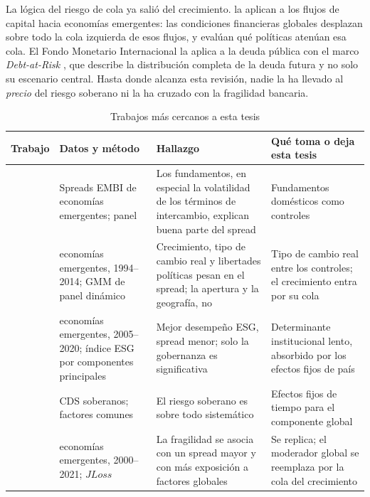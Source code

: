 La lógica del riesgo de cola ya salió del crecimiento. \citet{GelosEtAl2022} la aplican a los flujos de capital hacia economías emergentes: las condiciones financieras globales desplazan sobre todo la cola izquierda de esos flujos, y evalúan qué políticas atenúan esa cola. El Fondo Monetario Internacional la aplica a la deuda pública con el marco \textit{Debt-at-Risk} \citep{IMF2024FM}, que describe la distribución completa de la deuda futura y no solo su escenario central. Hasta donde alcanza esta revisión, nadie la ha llevado al \emph{precio} del riesgo soberano ni la ha cruzado con la fragilidad bancaria.

\begin{table}[htbp]
\centering
\caption{Trabajos más cercanos a esta tesis}
\label{tab:estado-arte}
\footnotesize
\begin{tabular}{>{\raggedright\arraybackslash}p{}>{\raggedright\arraybackslash}p{}>{\raggedright\arraybackslash}p{}>{\raggedright\arraybackslash}p{}}
\toprule
Trabajo & Datos y método & Hallazgo & Qué toma o deja esta tesis \\
\midrule
\citet{HilscherNosbusch2010} & Spreads EMBI de economías emergentes; panel & Los fundamentos, en especial la volatilidad de los términos de intercambio, explican buena parte del spread & Fundamentos domésticos como controles \\
\addlinespace
\citet{TebaldiNguyenZuluaga2018} & 31 economías emergentes, 1994--2014; GMM de panel dinámico & Crecimiento, tipo de cambio real y libertades políticas pesan en el spread; la apertura y la geografía, no & Tipo de cambio real entre los controles; el crecimiento entra por su cola \\
\addlinespace
\citet{BarnecheGrezziPanario2024} & 19 economías emergentes, 2005--2020; índice ESG por componentes principales & Mejor desempeño ESG, spread menor; solo la gobernanza es significativa & Determinante institucional lento, absorbido por los efectos fijos de país \\
\addlinespace
\citet{LongstaffEtAl2011} & CDS soberanos; factores comunes & El riesgo soberano es sobre todo sistemático & Efectos fijos de tiempo para el componente global \\
\addlinespace
\citet{Chari2024b} & 19 economías emergentes, 2000--2021; $JLoss$ & La fragilidad se asocia con un spread mayor y con más exposición a factores globales & Se replica; el moderador global se reemplaza por la cola del crecimiento \\

\end{tabular}
\end{table}
